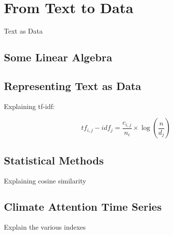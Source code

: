 \chapter{From Text to Data}


 Text as Data

\section{Some Linear Algebra}

\section{Representing Text as Data}

 Explaining tf-idf:

\begin{equation}
tf_{i,j} - idf_{j} = \frac{c_{i,j}}{n_i} \times \log (\frac{n}{d_j})
\end{equation}

\section{Statistical Methods}

Explaining cosine similarity




\section{Climate Attention Time Series}

Explain the various indexes

